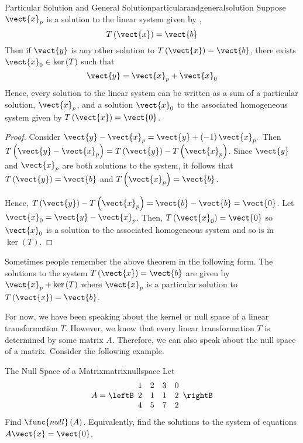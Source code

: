 \begin{theorem}{Particular Solution and General Solution}{particularandgeneralsolution}
Suppose $\vect{x}_{p}$ is a solution to the linear system given by ,
\begin{equation*}
T\left( \vect{x} \right) = \vect{b}
\end{equation*}
Then if $\vect{y}$ is any other solution to $T\left(\vect{x}\right)=\vect{b}$, 
 there exists $\vect{x}_0 \in \ker
\left( T\right) $ such that
\begin{equation*}
\vect{y} = \vect{x}_{p}+ \vect{x}_0
\end{equation*}
Hence, every solution to the linear system can be written as a sum of a particular solution, $\vect{x}_p$,
 and a solution $\vect{x}_0$ to the associated 
homogeneous system given by $T\left(\vect{x}\right)=\vect{0}$.
\end{theorem}

\begin{proof}
Consider $\vect{y} - \vect{x}_{p}= \vect{y} + \left(
-1\right) \vect{x}_{p}.$ Then $T\left( \vect{y} - \vect{x}_{p}\right) =T\left(\vect{y}\right)
-T\left( \vect{x}_{p} \right)$. Since $\vect{y}$ and $\vect{x}_{p}$ are both solutions to the system, it follows that $T\left(\vect{y}\right)= \vect{b} $
and $T\left(\vect{x}_p\right) = \vect{b}$. 

Hence, $T\left(\vect{y}\right)-T\left( \vect{x}_{p} \right)
=\vect{b} - \vect{b} = \vect{0}$.  Let $\vect{x}_0 = \vect{y} - \vect{x}_{p}$.
Then, $T\left(\vect{x}_0\right)= \vect{0} $ so $\vect{x}_0$ is a solution to the associated homogeneous system and so is in $\ker \left(T\right)$.
\end{proof}

Sometimes people remember the above theorem in the following form. The
solutions to the system $T\left(\vect{x}\right)=\vect{b}$ are given by 
$\vect{x}_{p}+\ker \left( T\right) $ where $\vect{x}_{p}$ is a particular
solution to $T\left(\vect{x}\right)=\vect{b}$.

For now, we have been speaking about the kernel or null space of a linear transformation $T$. However, 
we know that every linear transformation $T$ is determined by some matrix $A$. Therefore,
we can also speak about the null space of a matrix. Consider the following example.  

\begin{example}{The Null Space of a Matrix}{matrixnullspace}
Let
\begin{equation*}
A=\leftB
\begin{array}{rrrr}
1 & 2 & 3 & 0 \\
2 & 1 & 1 & 2 \\
4 & 5 & 7 & 2
\end{array}
\rightB
\end{equation*}
Find $\func{null} \left( A\right) $. Equivalently, find the solutions to the
system of equations $A\vect{x}=\vect{0}$.
\end{example}

